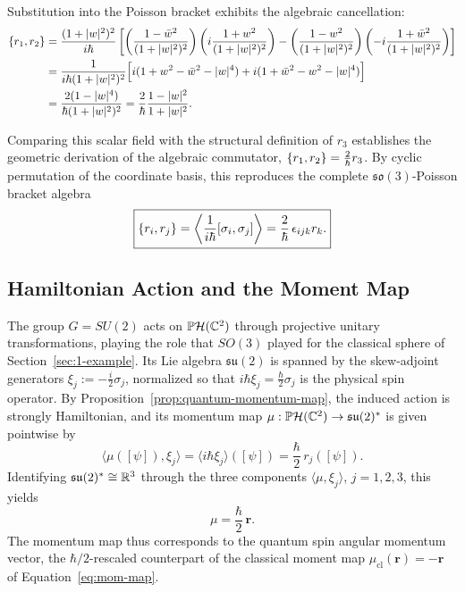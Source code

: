 \noindent Substitution into the Poisson bracket exhibits the algebraic cancellation:
\begin{align}
	\{r_1,r_2\} &= \frac{(1+|w|^2)^2}{i\hbar} \left[ \left(\frac{1 - \bar{w}^2}{(1+|w|^2)^2}\right) \left(i\frac{1 + w^2}{(1+|w|^2)^2}\right) - \left(\frac{1 - w^2}{(1+|w|^2)^2}\right) \left(-i\frac{1 + \bar{w}^2}{(1+|w|^2)^2}\right) \right] \nonumber \\
	&= \frac{1}{i\hbar(1+|w|^2)^2} \Big[ i(1 + w^2 - \bar{w}^2 - |w|^4) + i(1 + \bar{w}^2 - w^2 - |w|^4) \Big] \nonumber \\
	&= \frac{2(1 - |w|^4)}{\hbar(1+|w|^2)^2} = \frac{2}{\hbar} \frac{1 - |w|^2}{1+|w|^2}.
\end{align}

\noindent Comparing this scalar field with the structural definition of $r_3$ establishes the geometric derivation of the algebraic commutator, $\{r_1,r_2\} = \frac{2}{\hbar} r_3$. By cyclic permutation of the coordinate basis, this reproduces the complete $\mathfrak{so}(3)$-Poisson bracket algebra
\begin{equation}
	\boxed{\{r_i,r_j\}=\left\langle\dfrac{1}{i\hbar}[\sigma_i,\sigma_j]\right\rangle=\frac2\hbar\,\epsilon_{ijk}r_k.} \label{eq:qubit-poisson}
\end{equation}

\subsection*{Hamiltonian Action and the Moment Map}

The group $G=SU(2)$ acts on $\PH(\C^2)$ through projective unitary transformations, playing the role that $SO(3)$ played for the classical sphere of Section~\ref{sec:1-example}. Its Lie algebra $\mathfrak{su}(2)$ is spanned by the skew-adjoint generators $\xi_j:=-\frac i2\sigma_j$, normalized so that $i\hbar\xi_j=\frac\hbar2\sigma_j$ is the physical spin operator. By Proposition~\ref{prop:quantum-momentum-map}, the induced action is strongly Hamiltonian, and its momentum map $\mu:\PH(\C^2)\to\mathfrak{su}(2)^*$ is given pointwise by
\[
\langle\mu([\psi]),\xi_j\rangle=\langle i\hbar\xi_j\rangle([\psi])=\frac\hbar2\,r_j([\psi]).
\]
Identifying $\mathfrak{su}(2)^*\cong\mathbb{R}^3$ through the three components $\langle\mu,\xi_j\rangle$, $j=1,2,3$, this yields
\begin{equation}
	\boxed{\mu=\frac\hbar2\,\mathbf r.} \label{eq:qubit-mom-map}
\end{equation}
The momentum map thus corresponds to the quantum spin angular momentum vector, the $\hbar/2$-rescaled counterpart of the classical moment map $\mu_{\mathrm{cl}}(\mathbf r)=-\mathbf r$ of Equation~\eqref{eq:mom-map}.

